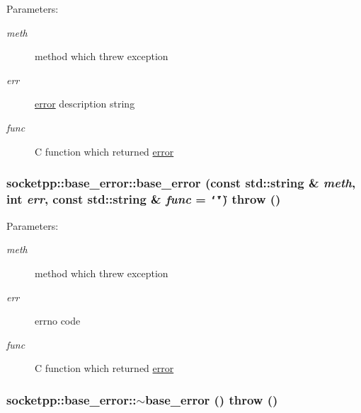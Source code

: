 \begin{Desc}
\item[Parameters:]
\begin{description}
\item[{\em meth}]method which threw exception \item[{\em err}]\hyperlink{classsocketpp_1_1error}{error} description string \item[{\em func}]C function which returned \hyperlink{classsocketpp_1_1error}{error} \end{description}
\end{Desc}
\hypertarget{classsocketpp_1_1base__error_4be3a2a0a278b7b3ab0e494af7406573}{
\subsubsection[{base\_\-error}]{\setlength{\rightskip}{0pt plus 5cm}socketpp::base\_\-error::base\_\-error (const std::string \& {\em meth}, \/  int {\em err}, \/  const std::string \& {\em func} = {\tt \char`\"{}\char`\"{}})  throw ()}}
\label{classsocketpp_1_1base__error_4be3a2a0a278b7b3ab0e494af7406573}


\begin{Desc}
\item[Parameters:]
\begin{description}
\item[{\em meth}]method which threw exception \item[{\em err}]errno code \item[{\em func}]C function which returned \hyperlink{classsocketpp_1_1error}{error} \end{description}
\end{Desc}
\hypertarget{classsocketpp_1_1base__error_2e6c4d48d426926c79d86a610ba3029b}{
\subsubsection[{$\sim$base\_\-error}]{\setlength{\rightskip}{0pt plus 5cm}socketpp::base\_\-error::$\sim$base\_\-error ()  throw ()}}
\label{classsocketpp_1_1base__error_2e6c4d48d426926c79d86a610ba3029b}




